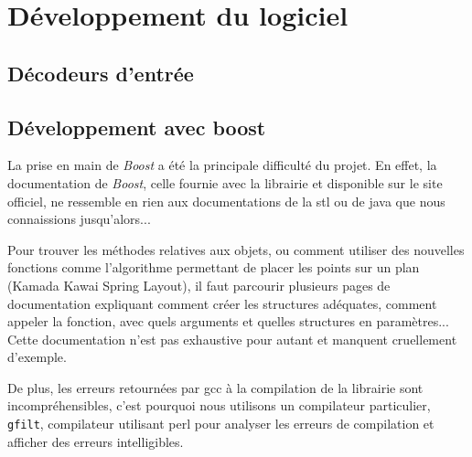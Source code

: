 \section{Développement du logiciel}
\subsection{Décodeurs d'entrée}
\subsection{Développement avec boost}
La prise en main de \textit{Boost} a été la principale difficulté du projet. En effet, la documentation de \textit{Boost}, celle fournie avec la librairie et disponible sur le site officiel, ne ressemble en rien aux documentations de la stl ou de java que nous connaissions jusqu'alors...

Pour trouver les méthodes relatives aux objets, ou comment utiliser des nouvelles fonctions comme l'algorithme permettant de placer les points sur un plan (Kamada Kawai Spring Layout), il faut parcourir plusieurs pages de documentation expliquant comment créer les structures adéquates, comment appeler la fonction, avec quels arguments et quelles structures en paramètres... Cette documentation n'est pas exhaustive pour autant et manquent cruellement d'exemple. 

De plus, les erreurs retournées par gcc à la compilation de la librairie sont incompréhensibles, c'est pourquoi nous utilisons un compilateur particulier, \verb|gfilt|, compilateur utilisant perl pour analyser les erreurs de compilation et afficher des erreurs intelligibles. 





